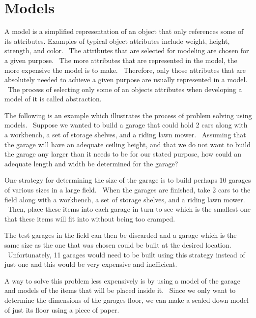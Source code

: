 \documentclass[12pt,twoside]{book}
\begin{document}
\section[Models]{Models}

A model is a simplified representation of an object that only references some of its attributes. Examples of typical object attributes include weight, height, strength, and color. \ The attributes that are selected for modeling are chosen for a given purpose. \ The more attributes that are represented in the model, the more expensive the model is to make. \ Therefore, only those attributes that are absolutely needed to achieve a given purpose are usually represented in a model. \ The process of selecting only some of an object{\textquotesingle}s attributes when developing a model of it is called abstraction. 

\bigskip

The following is an example which illustrates the process of problem solving using models. \ Suppose we wanted to build a garage that could hold 2 cars along with a workbench, a set of storage shelves, and a riding lawn mower. \ Assuming that the garage will have an adequate ceiling height, and that we do not want to build the garage any larger than it needs to be for our stated purpose, how could an adequate length and width be determined for the garage? 

\bigskip

One strategy for determining the size of the garage is to build perhaps 10 garages of various sizes in a large field. \ When the garages are finished, take 2 cars to the field along with a workbench, a set of storage shelves, and a riding lawn mower. \ Then, place these items into each garage in turn to see which is the smallest one that these items will fit into without being too cramped.


\bigskip

The test garages in the field can then be discarded and a garage which is the same size as the one that was chosen could be built at the desired location. \ Unfortunately, 11 garages would need to be built using this strategy instead of just one and this would be very expensive and inefficient. 

\bigskip

A way to solve this problem less expensively is by using a model of the garage and models of the items that will be placed inside it. \ Since we only want to determine the dimensions of the garage{\textquotesingle}s floor, we can make a scaled down model of just its floor using a piece of paper. 
\end{document}
